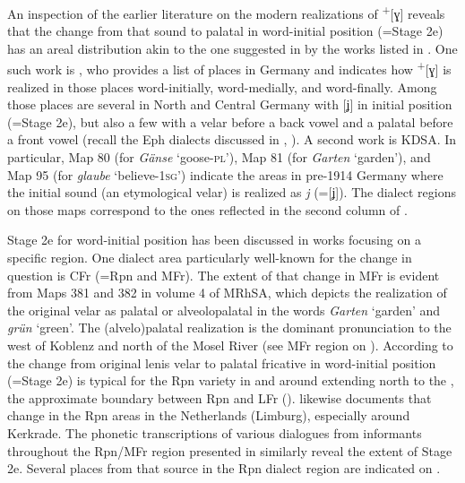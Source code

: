 An inspection of the earlier literature on the modern realizations of  \textsuperscript{+}[ɣ] reveals that the change from that sound to palatal in word-initial position (=Stage 2e) has an areal distribution akin to the one suggested in by the works listed in . One such work is \citet{Diederichs1884}, who provides a list of places in Germany and indicates how  \textsuperscript{+}[ɣ] is realized in those places word-initially, word-medially, and word-finally. Among those places are several in North and Central Germany with [ʝ] in initial position (=Stage 2e), but also a few with a velar before a back vowel and a palatal before a front vowel (recall the Eph dialects discussed in , ). A second work is KDSA. In particular, Map 80 (for \textit{Gänse} ‘goose-\textsc{pl}’), Map 81 (for \textit{Garten} ‘garden’), and Map 95 (for \textit{glaube} ‘believe-\textsc{1sg}’) indicate the areas in pre-1914 Germany where the initial sound (an etymological velar) is realized as \textit{j} (=[ʝ]). The dialect regions on those maps correspond to the ones reflected in the second column of .

Stage 2e for word-initial position has been discussed in works focusing on a specific region. One dialect area particularly well-known for the change in question is CFr (=Rpn and MFr). The extent of that change in MFr is evident from Maps 381 and 382 in volume 4 of MRhSA, which depicts the realization of the original velar as palatal or alveolopalatal in the words \textit{Garten} ‘garden’ and \textit{grün} ‘green’. The (alvelo)palatal realization is the dominant pronunciation to the west of Koblenz and north of the Mosel River (see MFr region on ). According to \citet[397--398]{Cornelissen2000} the change from original lenis velar to palatal fricative in word-initial position (=Stage 2e) is typical for the Rpn variety in and around  extending north to the , the approximate boundary between Rpn and LFr ().  \citet[49--50]{vandeWijngaard2007} likewise documents that change in the Rpn areas in the Netherlands (Limburg), especially around Kerkrade. The phonetic transcriptions of various dialogues from informants throughout the Rpn/MFr region presented in \citet{CornelissenEtAl1989} similarly reveal the extent of Stage 2e. Several places from that source in the Rpn dialect region are indicated on .

